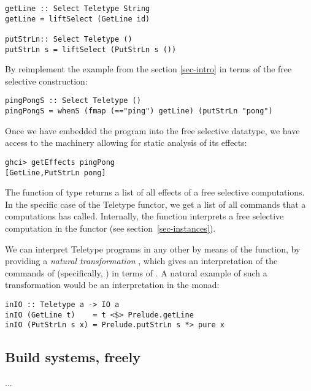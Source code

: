 \begin{verbatim}
getLine :: Select Teletype String
getLine = liftSelect (GetLine id)

putStrLn:: Select Teletype ()
putStrLn s = liftSelect (PutStrLn s ())
\end{verbatim}

By reimplement the  example from the section \ref{sec-intro}
in terms of the free selective construction:

\begin{verbatim}
pingPongS :: Select Teletype ()
pingPongS = whenS (fmap (=="ping") getLine) (putStrLn "pong")
\end{verbatim}

Once we have embedded the  program into the free selective datatype,
we have access to the machinery allowing for static analysis of its effects:

\begin{verbatim}
ghci> getEffects pingPong
[GetLine,PutStrLn pong]
\end{verbatim}

The  function of type 
returns a list of all effects of a free selective computations. In the specific case of
the Teletype functor, we get a list of all commands that a computations has called.
Internally, the  function interprets a free selective computation
in the  functor (see section~\ref{sec-instances}).

We can interpret Teletype programs in any other  by means of the
 function, by providing a \emph{natural transformation} , which gives an interpretation of the commands of
 (specifically, ) in terms of . A natural example of such a
transformation would be an interpretation in the  monad:

\begin{verbatim}
inIO :: Teletype a -> IO a
inIO (GetLine t)    = t <$> Prelude.getLine
inIO (PutStrLn s x) = Prelude.putStrLn s *> pure x
\end{verbatim}

\subsection{Build systems, freely}

...

